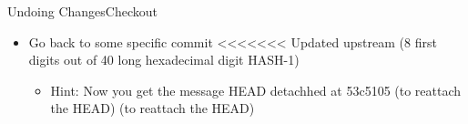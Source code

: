 \begin{frame}{Undoing Changes}{Checkout}
\begin{itemize}
\item Go back to some specific commit
<<<<<<< Updated upstream
 (8 first digits out of 40 long hexadecimal digit HASH-1)
\begin{itemize}
\item Hint: Now you get the message {\color{red} HEAD detachhed at 53c5105}
   (to reattach the HEAD)
   (to reattach the HEAD)

\end{itemize}
\end{itemize}
\end{frame}
